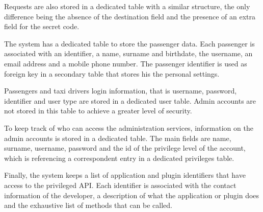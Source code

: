 Requests are also stored in a dedicated table with a similar structure, the only difference being the absence of the destination field and the presence of an extra field for the secret code. 

The system has a dedicated table to store the passenger data. Each passenger is associated with an identifier, a name, surname and birthdate, the username, an email address and a mobile phone number. The passenger identifier is used as foreign key in a secondary table that stores his the personal settings.

Passengers and taxi drivers login information, that is username, password, identifier and user type are stored in a dedicated user table. Admin accounts are not stored in this table to achieve a greater level of security. 

To keep track of who can access the administration services, information on the admin accounts is stored in a dedicated table. The main fields are name, surname, username, password and the id of the privilege level of the account, which is referencing a correspondent entry in a dedicated privileges table.

Finally, the system keeps a list of application and plugin identifiers that have access to the privileged API. Each identifier is associated with the contact information of the developer, a description of what the application or plugin does and the exhaustive list of methods that can be called. 

